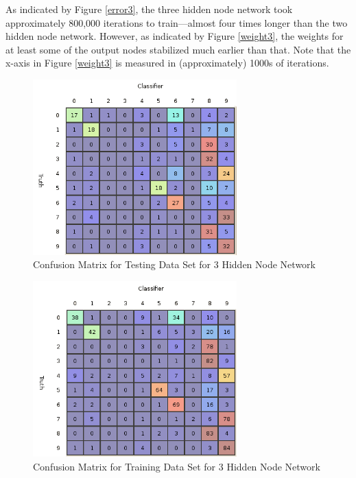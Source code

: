 \documentclass{article}
\begin{document}
As indicated by Figure \ref{error3}, the three hidden node network took approximately 800,000 iterations to train---almost four times longer than the two hidden node network. However, as indicated by Figure \ref{weight3}, the weights for at least some of the output nodes stabilized much earlier than that. Note that the x-axis in Figure \ref{weight3} is measured in (approximately) 1000s of iterations.

\begin{figure}
\centering
\includegraphics[width=0.7\textwidth]{data/final/3_test_confusion.png}
\caption{Confusion Matrix for Testing Data Set for 3 Hidden Node Network}
\label{testconfusion3}
\end{figure}

\begin{figure}
\centering
\includegraphics[width=0.7\textwidth]{data/final/3_train_confusion.png}
\caption{Confusion Matrix for Training Data Set for 3 Hidden Node Network}
\label{trainconfusion3}
\end{figure}
\end{document}
